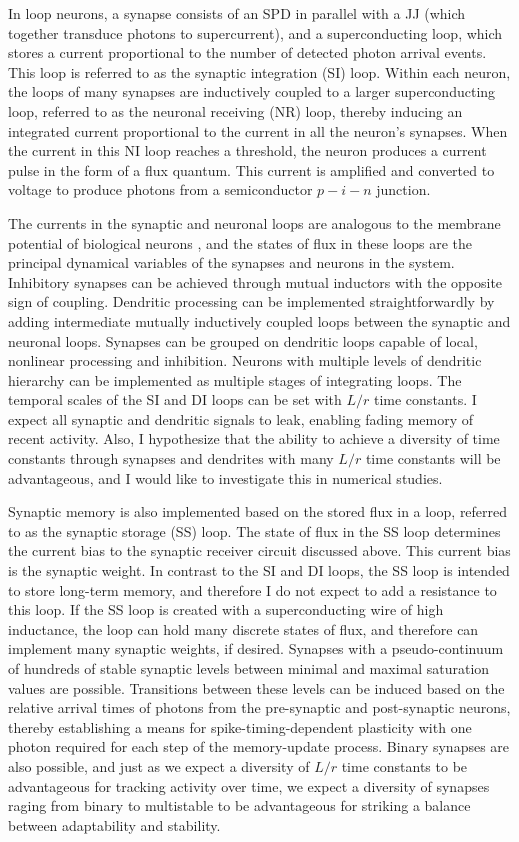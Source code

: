 \documentclass[]{article}
\begin{document}
In loop neurons, a synapse consists of an SPD in parallel with a JJ (which together transduce photons to supercurrent), and a superconducting loop, which stores a current proportional to the number of detected photon arrival events. This loop is referred to as the synaptic integration (SI) loop. Within each neuron, the loops of many synapses are inductively coupled to a larger superconducting loop, referred to as the neuronal receiving (NR) loop, thereby inducing an integrated current proportional to the current in all the neuron's synapses. When the current in this NI loop reaches a threshold, the neuron produces a current pulse in the form of a flux quantum. This current is amplified and converted to voltage to produce photons from a semiconductor $p-i-n$ junction.

The currents in the synaptic and neuronal loops are analogous to the membrane potential of biological neurons \cite{daab2001}, and the states of flux in these loops are the principal dynamical variables of the synapses and neurons in the system. Inhibitory synapses can be achieved through mutual inductors with the opposite sign of coupling. Dendritic processing can be implemented straightforwardly by adding intermediate mutually inductively coupled loops between the synaptic and neuronal loops. Synapses can be grouped on dendritic loops capable of local, nonlinear processing and inhibition. Neurons with multiple levels of dendritic hierarchy can be implemented as multiple stages of integrating loops. The temporal scales of the SI and DI loops can be set with $L/r$ time constants. I expect all synaptic and dendritic signals to leak, enabling fading memory of recent activity. Also, I hypothesize that the ability to achieve a diversity of time constants through synapses and dendrites with many $L/r$ time constants will be advantageous, and I would like to investigate this in numerical studies.

Synaptic memory is also implemented based on the stored flux in a loop, referred to as the synaptic storage (SS) loop. The state of flux in the SS loop determines the current bias to the synaptic receiver circuit discussed above. This current bias is the synaptic weight. In contrast to the SI and DI loops, the SS loop is intended to store long-term memory, and therefore I do not expect to add a resistance to this loop. If the SS loop is created with a superconducting wire of high inductance, the loop can hold many discrete states of flux, and therefore can implement many synaptic weights, if desired. Synapses with a pseudo-continuum of hundreds of stable synaptic levels between minimal and maximal saturation values are possible. Transitions between these levels can be induced based on the relative arrival times of photons from the pre-synaptic and post-synaptic neurons, thereby establishing a means for spike-timing-dependent plasticity with one photon required for each step of the memory-update process. Binary synapses are also possible, and just as we expect a diversity of $L/r$ time constants to be advantageous for tracking activity over time, we expect a diversity of synapses raging from binary to multistable to be advantageous for striking a balance between adaptability and stability.
\end{document}
